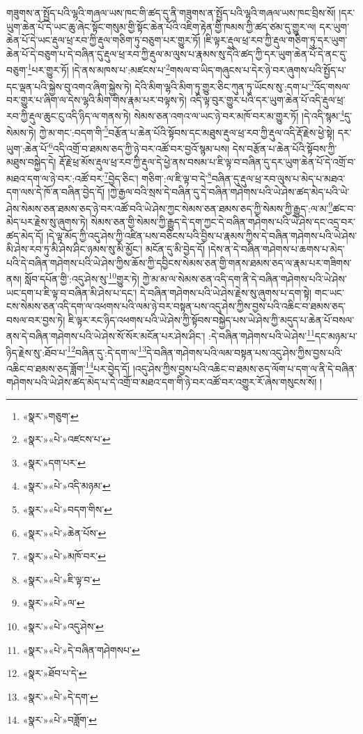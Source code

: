 གཟུགས་ན་སྤྱོད་པའི་ལྷའི་གཞལ་ཡས་ཁང་གི་ཚད་དུ་ནི་གཟུགས་ན་སྤྱོད་པའི་ལྷའི་གཞལ་ཡས་ཁང་བྲིས་སོ། །དར་ཡུག་ཆེན་པོ་དེ་ཡང་ཆུ་ཞེང་སྟོང་གསུམ་གྱི་སྟོང་ཆེན་པོའི་འཇིག་རྟེན་གྱི་ཁམས་ཀྱི་ཚད་ཙམ་དུ་གྱུར་ལ། དར་ཡུག་ཆེན་པོ་དེ་ཡང་རྡུལ་ཕྲ་རབ་ཀྱི་རྡུལ་གཅིག་ཏུ་བཅུག་པར་གྱུར་ཏོ། །ཇི་ལྟར་རྡུལ་ཕྲ་རབ་ཀྱི་རྡུལ་གཅིག་ཏུ་དར་ཡུག་ཆེན་པོ་དེ་བཅུག་པ་དེ་བཞིན་དུ་རྡུལ་ཕྲ་རབ་ཀྱི་རྡུལ་མ་ལུས་པ་རྣམས་སུ་དེའི་ཚད་ཀྱི་དར་ཡུག་ཆེན་པོ་དེ་ནང་དུ་བཅུག་\footnote{«སྣར་»གཅུག་}པར་གྱུར་ཏོ། །དེ་ནས་མཁས་པ་:མཛངས་པ་\footnote{«སྣར་»«པེ་»འཛངས་པ་}གསལ་བ་ཡིད་གཞུངས་པ་དེར་ཉེ་བར་ཞུགས་པའི་སྤྱོད་པ་དང་ལྡན་པའི་སྐྱེས་བུ་འགའ་ཞིག་སྐྱེས་ཏེ། དེའི་མིག་ལྷའི་མིག་ཏུ་གྱུར་ཅིང་ཀུན་ཏུ་ཡོངས་སུ་:དག་པ་\footnote{«སྣར་»དག་པར་}འོད་གསལ་བར་གྱུར་པ་ཞིག་ལ་དེས་ལྷའི་མིག་གིས་རྣམ་པར་བལྟས་ཏེ། འདི་ལྟ་བུར་གྱུར་པའི་དར་ཡུག་ཆེན་པོ་འདི་རྡུལ་ཕྲ་རབ་ཀྱི་རྡུལ་ཆུང་ངུ་འདི་ཉིད་ལ་གནས་ཏེ། སེམས་ཅན་འགའ་ལ་ཡང་ཉེ་བར་མཁོ་བར་མ་གྱུར་ཏོ། །དེ་འདི་སྙམ་\footnote{«སྣར་»«པེ་»འདི་མཉམ་}དུ་སེམས་ཏེ། ཀྱེ་མ་གང་:བདག་གི་\footnote{«སྣར་»«པེ་»བདག་གིས་}བརྩོན་པ་ཆེན་པོའི་སྟོབས་དང་མཐུས་རྡུལ་ཕྲ་རབ་ཀྱི་རྡུལ་འདི་རྡོ་རྗེས་ཕྱེ་སྟེ། དར་ཡུག་:ཆེན་པོ་\footnote{«སྣར་»«པེ་»ཆེན་པོས་}འདི་འགྲོ་བ་ཐམས་ཅད་ཀྱི་ཉེ་བར་འཚོ་བར་བྱའོ་སྙམ་པས། དེས་བརྩོན་པ་ཆེན་པོའི་སྟོབས་ཀྱི་མཐུས་བསྐྱེད་དེ། རྡོ་རྗེ་ཕྲ་མོས་རྡུལ་ཕྲ་རབ་ཀྱི་རྡུལ་དེ་ཕྱེ་ནས་བསམ་པ་ཇི་ལྟ་བ་བཞིན་དུ་དར་ཡུག་ཆེན་པོ་དེ་འགྲོ་བ་མཐའ་དག་ལ་ཉེ་བར་:འཚོ་བར་\footnote{«སྣར་»«པེ་»མཁོ་བར་}བྱེད་ཅིང་། གཅིག་:ལ་ཇི་ལྟ་བ་དེ་\footnote{«སྣར་»«པེ་»ཇི་ལྟ་བ་}བཞིན་དུ་རྡུལ་ཕྲ་རབ་ལུས་པ་མེད་པ་མཐའ་དག་ལས་དེ་ཁོ་ན་བཞིན་བྱེད་དོ། །ཀྱེ་རྒྱལ་བའི་སྲས་དེ་བཞིན་དུ་དེ་བཞིན་གཤེགས་པའི་ཡེ་ཤེས་ཚད་མེད་པའི་ཡེ་ཤེས་སེམས་ཅན་ཐམས་ཅད་ཉེ་བར་འཚོ་བའི་ཡེ་ཤེས་ཀྱང་སེམས་ཅན་ཐམས་ཅད་ཀྱི་སེམས་ཀྱི་རྒྱུད་:ལ་མ་\footnote{«སྣར་»«པེ་»ལ་}ཚང་བ་མེད་པར་རྗེས་སུ་ཞུགས་ཏེ། སེམས་ཅན་གྱི་སེམས་ཀྱི་རྒྱུད་དེ་དག་ཀྱང་དེ་བཞིན་གཤེགས་པའི་ཡེ་ཤེས་དང་འདྲ་བར་ཚད་མེད་དོ། །དེ་ལྟ་མོད་ཀྱི་འདུ་ཤེས་ཀྱི་འཛིན་པས་བཅིངས་པའི་བྱིས་པ་རྣམས་ཀྱིས་དེ་བཞིན་གཤེགས་པའི་ཡེ་ཤེས་མི་ཤེས་རབ་ཏུ་མི་ཤེས་ཤིང་ཉམས་སུ་མི་མྱོང་། མངོན་དུ་མི་བྱེད་དོ། །དེས་ན་དེ་བཞིན་གཤེགས་པ་ཆགས་པ་མེད་པའི་དེ་བཞིན་གཤེགས་པའི་ཡེ་ཤེས་ཀྱིས་ཆོས་ཀྱི་དབྱིངས་སེམས་ཅན་གྱི་གནས་ཐམས་ཅད་ལ་རྣམ་པར་གཟིགས་ནས། སློབ་དཔོན་གྱི་:འདུ་ཤེས་སུ་\footnote{«སྣར་»«པེ་»འདུ་ཤེས་}གྱུར་ཏེ། ཀྱེ་མ་མ་ལ་སེམས་ཅན་འདི་དག་ནི་དེ་བཞིན་གཤེགས་པའི་ཡེ་ཤེས་ཡང་དག་པ་ཇི་ལྟ་བ་བཞིན་མི་ཤེས་པ་དང་། དེ་བཞིན་གཤེགས་པའི་ཡེ་ཤེས་རྗེས་སུ་ཞུགས་པ་དག་སྟེ། གང་ཡང་ངས་སེམས་ཅན་འདི་དག་ལ་འཕགས་པའི་ལམ་ཉེ་བར་བསྟན་པས་འདུ་ཤེས་ཀྱིས་བྱས་པའི་འཆིང་བ་ཐམས་ཅད་བསལ་བར་བྱས་ཏེ། ཇི་ལྟར་རང་ཉིད་འཕགས་པའི་ཡེ་ཤེས་ཀྱི་སྟོབས་བསྐྱེད་པས་ཡེ་ཤེས་ཀྱི་མདུད་པ་ཆེན་པོ་བསལ་ནས་དེ་བཞིན་གཤེགས་པའི་ཡེ་ཤེས་སོ་སོར་མངོན་པར་ཤེས་ཤིང་། :དེ་བཞིན་གཤེགས་པའི་ཡེ་ཤེས་\footnote{«སྣར་»«པེ་»དེ་བཞིན་གཤེགསཔ་}དང་མཉམ་པ་ཉིད་རྗེས་སུ་:ཐོབ་པ་\footnote{«སྣར་»ཐོབ་པ་དེ་}བཞིན་དུ་:དེ་དག་ལ་\footnote{«སྣར་»«པེ་»དེ་དག་}དེ་བཞིན་གཤེགས་པའི་ལམ་བསྟན་པས་འདུ་ཤེས་ཀྱིས་བྱས་པའི་འཆིང་བ་ཐམས་ཅད་ཟློག་\footnote{«སྣར་»«པེ་»བཟློག་}པར་བྱེད་དོ། །འདུ་ཤེས་ཀྱིས་བྱས་པའི་འཆིང་བ་ཐམས་ཅད་ལོག་པ་དག་ལ་ནི་དེ་བཞིན་གཤེགས་པའི་ཡེ་ཤེས་ཚད་མེད་པ་དེ་འགྲོ་བ་མཐའ་དག་གི་ཉེ་བར་འཚོ་བར་འགྱུར་རོ་ཞེས་གསུངས་སོ། །
